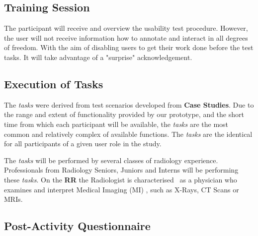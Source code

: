 \subsection{Training Session}

The participant will receive and overview the usability test procedure. However, the user will not receive information how to annotate and interact in all degrees of freedom. With the aim of disabling users to get their work done before the test tasks. It will take advantage of a "surprise" acknowledgement.


\subsection{Execution of Tasks}

The \textit{tasks} were derived from test scenarios developed from \textbf{Case Studies}. Due to the range and extent of functionality provided by our prototype, and the short time from which each participant will be available, the \textit{tasks} are the most common and relatively complex of available functions. The \textit{tasks} are the identical for all participants of a given user role in the study.

The \textit{tasks} will be performed by several classes of radiology experience. Professionals from Radiology Seniors, Juniors and Interns will be performing these \textit{tasks}. On the \textbf{RR} the Radiologist is characterised~\cite{ehrlich2016patient, miglioretti2007radiologist} as a physician who examines and interpret Medical Imaging (MI) \cite{kobashi2017evaluation}, such as X-Rays, CT Scans or MRIs.



\subsection{Post-Activity Questionnaire}

